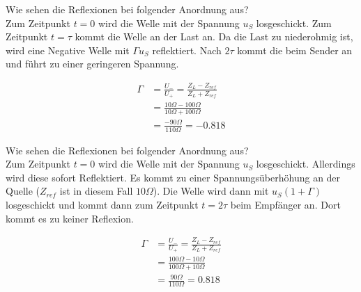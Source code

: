 \begin{karte}{Wie sehen die Reflexionen bei folgender Anordnung aus?\\
		\scalebox{.8}{}}
	Zum Zeitpunkt $t=0$ wird die Welle mit der Spannung $u_S$ losgeschickt. Zum Zeitpunkt $t=\tau$ kommt die Welle an der Last an. Da die Last zu niederohmig ist, wird eine Negative Welle mit $\Gamma u_S$ reflektiert. Nach $2\tau$ kommt die  beim Sender an und führt zu einer geringeren Spannung.\\
	\begin{minipage}{0.59\textwidth}
		\scalebox{.75}{}
	\end{minipage}
	\begin{minipage}{0.39\textwidth}
		\begin{align*}
		\Gamma &= \frac{U_-}{U_+} = \frac{Z_L-Z_{ref}}{Z_L+Z_{ref}}\\
		&= \frac{10\Omega-100\Omega}{10\Omega+100\Omega}\\
		&= \frac{-90\Omega}{110\Omega} = -0.818
		\end{align*}
	\end{minipage}
\end{karte}

\begin{karte}{Wie sehen die Reflexionen bei folgender Anordnung aus?\\
		\scalebox{.8}{}}
	Zum Zeitpunkt $t=0$ wird die Welle mit der Spannung $u_S$ losgeschickt. Allerdings wird diese sofort Reflektiert. Es kommt zu einer Spannungsüberhöhung an der Quelle ($Z_{ref}$ ist in diesem Fall $10\Omega$). Die Welle wird dann mit $u_S (1+\Gamma)$ losgeschickt und kommt dann zum Zeitpunkt $t=2\tau$ beim Empfänger an. Dort kommt es zu keiner Reflexion.\\
	\begin{minipage}{0.59\textwidth}
		\scalebox{.75}{}
	\end{minipage}
	\begin{minipage}{0.39\textwidth}
		\begin{align*}
		\Gamma &= \frac{U_-}{U_+} = \frac{Z_L-Z_{ref}}{Z_L+Z_{ref}}\\
		&= \frac{100\Omega-10\Omega}{100\Omega+10\Omega}\\
		&= \frac{90\Omega}{110\Omega} = 0.818
		\end{align*}
	\end{minipage}
\end{karte}

